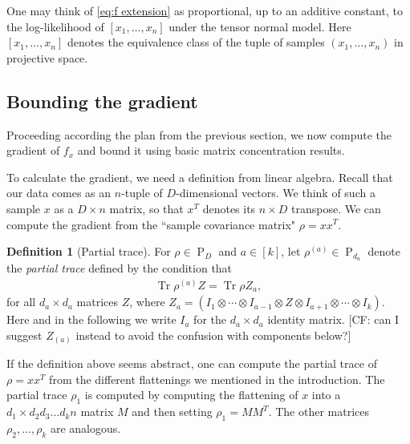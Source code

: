 \documentclass[aos]{imsart}
\theoremstyle{definition}
\newtheorem{definition}{Definition}
\DeclareMathOperator{\tr}{Tr}
\newcommand{\ot}{\otimes}
\newcommand{\PD}{\operatorname{P}}
\newcommand{\samp}{x}
\newcommand{\rv}{X}
\newcommand{\CF}[1]{{\color{purple}[CF: #1]}}
\begin{document}

One may think of \cref{eq:f extension} as proportional, up to an additive constant, to the log-likelihood of $[\samp_1, \dots, \samp_n]$ under the tensor normal model. Here $[\samp_1, \dots, \samp_n]$ denotes the equivalence class of the tuple of samples $(x_1, \dots, x_n)$ in projective space.

\subsection{Bounding the gradient}
Proceeding according the plan from the previous section, we now compute the gradient of $f_{\samp}$ and bound it using basic matrix concentration results.

To calculate the gradient, we need a definition from linear algebra. Recall that our data comes as an $n$-tuple of $D$-dimensional vectors. We think of such a sample $\samp$ as a $D \times n$ matrix, so that $\samp^T$ denotes its $n \times D$ transpose. We can compute the gradient from the ``sample covariance matrix" $\rho = \samp \samp^T$.

\begin{definition}[Partial trace]\label{def:single marginal}
For $\rho \in \PD_D$ and $a\in[k]$, let $\rho^{(a)} \in \PD_{d_a}$ denote the \emph{partial trace} defined by the condition that
\begin{align*}
  \tr \rho^{(a)} Z = \tr \rho Z_a,
\end{align*}
for all $d_a \times d_a$ matrices $Z$, where $Z_a = (I_1 \ot \cdots \ot I_{a-1} \ot Z \ot I_{a+1} \ot \cdots \ot I_k)$.
Here and in the following we write $I_a$ for the $d_a\times d_a$ identity matrix. \CF{can I suggest $Z_{(a)}$ instead to avoid the confusion with components below?}
\end{definition}

If the definition above seems abstract, one can compute the partial trace of $\rho = \samp \samp^T$ from the different flattenings we mentioned in the introduction. The partial trace $\rho_1$ is computed by computing the flattening of $\samp$ into a $d_1\times d_2 d_3 \dots d_k n$ matrix $M$ and then setting $\rho_1 = M M^T$. The other matrices $\rho_2, \dots, \rho_k$ are analogous.
\end{document}
